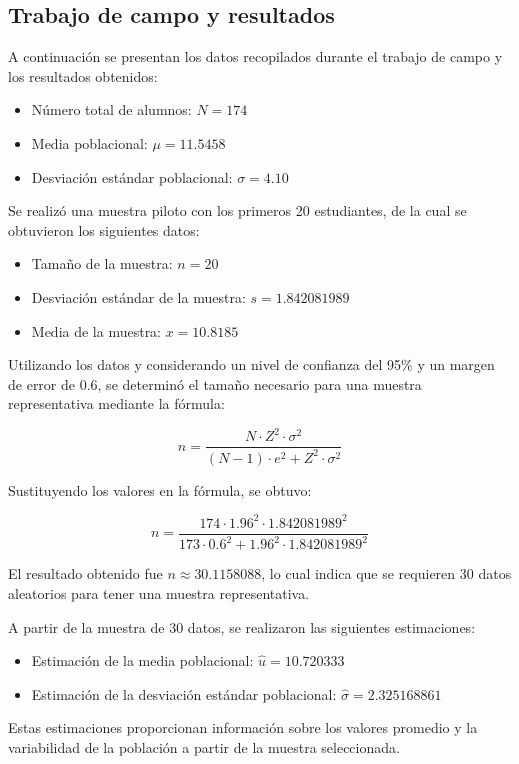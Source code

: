 \documentclass[
  letterpaper,
  DIV=11,
  numbers=noendperiod]{scrartcl}
\providecommand{\tightlist}{%
  \setlength{\itemsep}{0pt}\setlength{\parskip}{0pt}}\usepackage{longtable,booktabs,array}
\begin{document}
\hypertarget{trabajo-de-campo-y-resultados}{%
\subsection{Trabajo de campo y
resultados}\label{trabajo-de-campo-y-resultados}}

A continuación se presentan los datos recopilados durante el trabajo de
campo y los resultados obtenidos:

\begin{itemize}
\tightlist
\item
  Número total de alumnos: \(N = 174\)
\item
  Media poblacional: \(\mu = 11.5458\)
\item
  Desviación estándar poblacional: \(\sigma = 4.10\)
\end{itemize}

Se realizó una muestra piloto con los primeros 20 estudiantes, de la
cual se obtuvieron los siguientes datos:

\begin{itemize}
\tightlist
\item
  Tamaño de la muestra: \(n = 20\)
\item
  Desviación estándar de la muestra: \(s = 1.842081989\)
\item
  Media de la muestra: \(x = 10.8185\)
\end{itemize}

Utilizando los datos y considerando un nivel de confianza del 95\% y un
margen de error de 0.6, se determinó el tamaño necesario para una
muestra representativa mediante la fórmula:

\[
n = \frac{{N \cdot Z^2 \cdot \sigma^2}}{{(N-1) \cdot e^2 + Z^2 \cdot \sigma^2}}
\]

Sustituyendo los valores en la fórmula, se obtuvo:

\[
n = \frac{{174 \cdot 1.96^2 \cdot 1.842081989^2}}{{173 \cdot 0.6^2 + 1.96^2 \cdot 1.842081989^2}}
\]

El resultado obtenido fue \(n \approx 30.1158088\), lo cual indica que
se requieren 30 datos aleatorios para tener una muestra representativa.

A partir de la muestra de 30 datos, se realizaron las siguientes
estimaciones:

\begin{itemize}
\tightlist
\item
  Estimación de la media poblacional: \(\hat{u} = 10.720333\)
\item
  Estimación de la desviación estándar poblacional:
  \(\hat{\sigma} = 2.325168861\)
\end{itemize}

Estas estimaciones proporcionan información sobre los valores promedio y
la variabilidad de la población a partir de la muestra seleccionada.


\printbibliography
\end{document}
